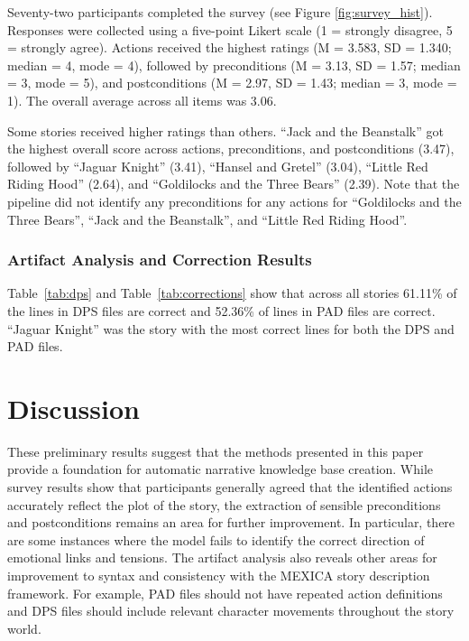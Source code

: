 \documentclass[phd,electronic,oneside,twosidetoc,letterpaper,chaptercenter,parttop,lof]{byumsphd}
\begin{document}
Seventy-two participants completed the survey (see Figure \ref{fig:survey_hist}). Responses were collected using a five-point Likert scale (1 = strongly disagree, 5 = strongly agree).
Actions received the highest ratings (M = 3.583, SD = 1.340; median = 4, mode = 4), followed by preconditions (M = 3.13, SD = 1.57; median = 3, mode = 5), and postconditions (M = 2.97, SD = 1.43; median = 3, mode = 1). The overall average across all items was 3.06.

Some stories received higher ratings than others. ``Jack and the Beanstalk'' got the highest overall score across actions, preconditions, and postconditions (3.47), followed by ``Jaguar Knight'' (3.41), ``Hansel and Gretel'' (3.04),  ``Little Red Riding Hood'' (2.64), and ``Goldilocks and the Three Bears'' (2.39). Note that the pipeline did not identify any preconditions for any actions for ``Goldilocks and the Three Bears'', ``Jack and the Beanstalk'', and ``Little Red Riding Hood''.


\subsubsection{Artifact Analysis and Correction Results}

Table~\ref{tab:dps} and Table~\ref{tab:corrections}  show that across all stories 61.11\% of the lines in DPS files are correct and 52.36\% of lines in PAD files are correct. ``Jaguar Knight'' was the story with the most correct lines for both the DPS and PAD files.


\section{Discussion}

These preliminary results suggest that the methods presented in this paper provide a foundation for automatic narrative knowledge base creation.  While survey results show that participants generally agreed that the identified actions accurately reflect the plot of the story, the extraction of sensible preconditions and postconditions remains an area for further improvement. In particular, there are some instances where the model fails to identify the correct direction of emotional links and tensions. The artifact analysis also reveals other areas for improvement to syntax and consistency with the MEXICA story description framework. For example, PAD files should not have repeated action definitions and DPS files should include relevant character movements throughout the story world.
\end{document}
